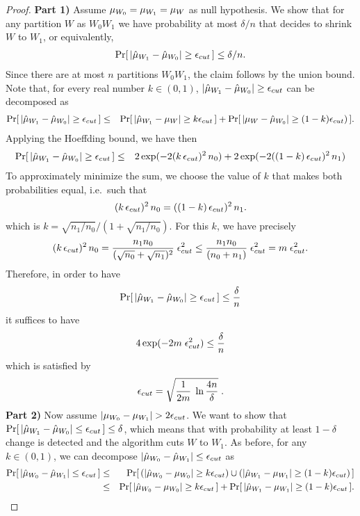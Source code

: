 \begin{proof}

{\bf{Part 1)}}
Assume ${\mu}_{W_0}={\mu}_{W_1}=\mu_W$ as null hypothesis. We show that for any partition
$W$ as $W_0W_1$ we have probability at most $\delta/n$ that \adwinz
decides to shrink $W$ to $W_1$, or equivalently,
%
\begin{eqnarray*}
\Pr [\, |\hat{\mu}_{W_1} - \hat{\mu}_{W_0}| \ge  \epsilon_{cut}\, ] \le \delta/n.
\end{eqnarray*}
%
Since there are at most $n$ partitions $W_0W_1$, the claim follows by the union bound. 
Note that, for every real number $k\in (0,1)$, $|\hat{\mu}_{W_1} - \hat{\mu}_{W_0}|\ge  \epsilon_{cut}$ 
can be decomposed as
\begin{eqnarray*}
\label{Edecomposeprobs1}
\Pr [\, |\hat{\mu}_{W_1} - \hat{\mu}_{W_0}| \ge  \epsilon_{cut} \,]
&\le& \Pr [\, |\hat{\mu}_{W_1} - \mu_W| \ge  k \epsilon_{cut} \,] + \Pr[\, |\mu_W - \hat{\mu}_{W_0}| \ge  (1-k)\epsilon_{cut} )\,].
\end{eqnarray*} 
Applying the Hoeffding bound, we have then 
\begin{eqnarray*}
\label{Edecomposeprobs2}
\Pr [\, |\hat{\mu}_{W_1} - \hat{\mu}_{W_0}| \ge  \epsilon_{cut} \,]
&\le& 2\exp(-2 (k\,\epsilon_{cut})^2 \,n_0) + 2\exp(-2 ((1-k)\,\epsilon_{cut})^2 \,n_1)
\end{eqnarray*} 
To approximately minimize the sum, we choose the value of $k$ 
that makes both probabilities equal, i.e.\ such that 
$$
(k \,\epsilon_{cut})^2 \,n_0 = ((1-k)\,\epsilon_{cut})^2 \,n_1. 
$$
which is $k=\sqrt{n_1 / n_0} / (1+\sqrt{n_1 / n_0})$. 
For this $k$, we have precisely 
$$
(k \,\epsilon_{cut})^2 \, n_0 
      = \frac{n_1 n_0}{(\sqrt{n_0}+\sqrt{n_1})^2}\; \epsilon_{cut}^2 
      \le \frac{n_1 n_0}{(n_0+n_1)} \; \epsilon_{cut}^2
      = m \; \epsilon_{cut}^2. 
$$
Therefore, in order to have 
$$
\Pr [\, |\hat{\mu}_{W_1} - \hat{\mu}_{W_0}| \ge  \epsilon_{cut} \,] \le \frac{\delta}{n}
$$
it suffices to have 
$$
4 \exp(-2m \; \epsilon_{cut}^2) \le \frac{\delta}{n}
$$
which is satisfied by 
$$
\epsilon_{cut} = \sqrt{\frac{1}{2m} \; \ln\frac{4n}{\delta}}\;.
$$
{\bf{Part 2)}}
Now assume $|\muz - \muu| > %
 2\epsc$. We want to show that
$\Pr [\, |\hat{\mu}_{W_1} - \hat{\mu}_{W_0}| \le  \epsilon_{cut} \,] \le \delta$, which means that 
with probability at least $1-\delta$ change is detected and 
the algorithm cuts $W$ to $W_1$. 
As before, for any $k\in (0,1)$, we can decompose $|\hat{\mu}_{W_0} - \hat{\mu}_{W_1}| \le  \epsilon_{cut} $ as
%
\begin{eqnarray*}
\Pr [\, |\hmuz - \hmuu| \le  \epsc \,] &\le& 
\Pr [\, (|\hmuz - \muz| \ge  k \epsc ) \cup (|\hmuu - \muu| \ge  (1-k)\epsc )\,]  \\   
&\le&\Pr [\, |\hmuz - \muz| \ge  k \epsc \,] +  
\Pr [\, |\hmuu - \muu| \ge  (1-k) \epsc \,]. 

\end{eqnarray*}
\end{proof}
